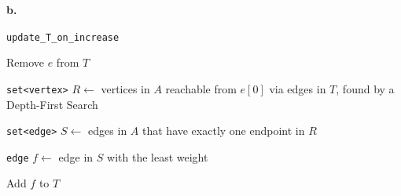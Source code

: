 \documentclass{article}
\begin{document}
\begin{enumerate}
\begin{center}
\begin{minipage}{\linewidth}
\begin{algorithm}[H]
        \end{algorithm}
      \end{minipage}
    \end{center}

    \textbf{b.}

    \begin{center}
      \begin{minipage}{\linewidth}
        \renewcommand{\thealgocf}{}
        \begin{algorithm}[H]
          \caption{\texttt{update\_T\_on\_increase}}


          Remove $e$ from $T$

          \texttt{set<vertex>} $R \gets$ vertices in $A$ reachable from $e[0]$ via edges in $T$, found by a Depth-First Search

          \texttt{set<edge>} $S \gets$ edges in $A$ that have exactly one endpoint in $R$

          \texttt{edge} $f \gets$ edge in $S$ with the least weight

          Add $f$ to $T$


        \end{algorithm}
      \end{minipage}
    \end{center}

\end{enumerate}
\end{document}
